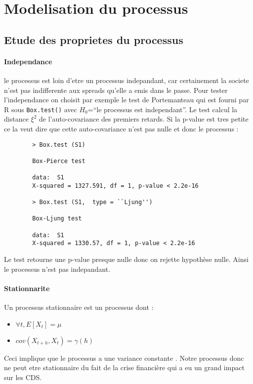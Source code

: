 \section{Modelisation du processus}
    \subsection{Etude des proprietes du processus}    
        \paragraph{Independance} 
        le processus est loin d'etre un processus indepandant, car certainement la
        societe n'est pas indifferente aux spreads qu'elle a emis dans le passe.
        Pour tester l'independance on choisit par exemple le test de Portemanteau
        qui est fourni par R sous \verb+Box.test()+ avec $H_0$=``le processus est
        independant''. Le test calcul
        la distance $\xi^2$ de l'auto-covariance des premiers retards. Si la p-value est tres petite ce la
        veut dire que cette auto-covariance n'est pas nulle et donc le processus :
        \begin{verbatim}
        > Box.test (S1)

        Box-Pierce test

        data:  S1
        X-squared = 1327.591, df = 1, p-value < 2.2e-16

        > Box.test (S1,  type = ``Ljung'')

        Box-Ljung test

        data:  S1
        X-squared = 1330.57, df = 1, p-value < 2.2e-16

        \end{verbatim}

        Le test retourne une p-value presque nulle donc on rejette hypothèse nulle.
        Ainsi le processus n'est pas indepandant.

        \paragraph{Stationnarite}
        Un processus stationnaire est un processus dont :
        \begin{itemize}
            \item $\forall t,E[X_t]=\mu$  
            \item $cov(X_{t+h},X_t)=\gamma(h)$ 
        \end{itemize}
        Ceci implique que le processus a une variance constante .
        Notre processus donc ne peut etre stationnaire du fait de la crise
        financière qui a eu un grand impact sur les CDS. 

